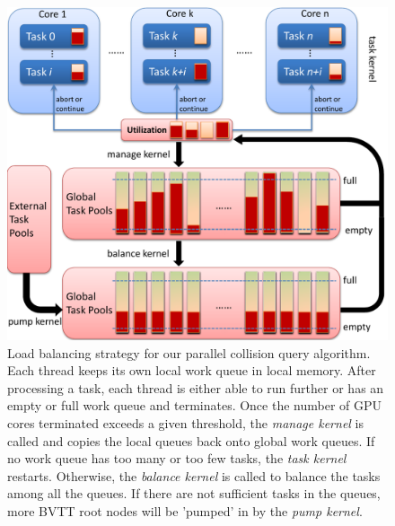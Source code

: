 \begin{figure}[htb]
  \centering
  \includegraphics[width=\linewidth]{figs/5/balance.pdf}
  \caption[Load balancing strategy for our parallel collision query algorithm]{Load balancing strategy for our parallel collision query algorithm. Each thread keeps its own local work queue in local memory. After processing a task, each thread is either able to run further or has an empty or full work queue and terminates. Once the number of GPU cores terminated exceeds a given threshold, the \emph{manage kernel} is called and copies the local queues back onto global work queues. If no work queue has too many or too few tasks, the \emph{task kernel} restarts. Otherwise, the \emph{balance kernel} is called to balance the tasks among all the queues. If there are not sufficient tasks in the queues, more BVTT root nodes will be 'pumped' in by the \emph{pump kernel}.}
  \label{fig:5:balance}
\end{figure}

